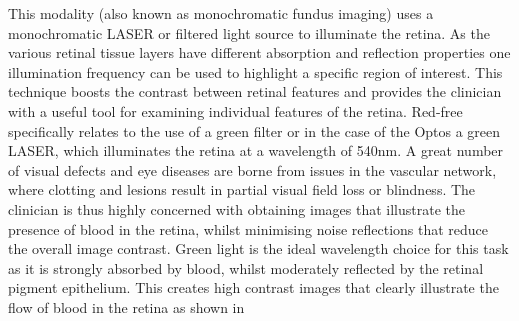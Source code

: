 This modality (also known as monochromatic fundus imaging) uses a monochromatic LASER or filtered light source to illuminate the retina. As the various retinal tissue layers have different absorption and reflection properties one illumination frequency can be used to highlight a specific region of interest. This technique boosts the contrast between retinal features and provides the clinician with a useful tool for examining individual features of the retina. Red-free specifically relates to the use of a green filter or in the case of the Optos a green LASER, which illuminates the retina at a wavelength of 540nm. A great number of visual defects and eye diseases are borne from issues in the vascular network, where clotting and lesions result in partial visual field loss or blindness. The clinician is thus highly concerned with obtaining images that illustrate the presence of blood in the retina, whilst minimising noise reflections that reduce the overall image contrast. Green light is the ideal wavelength choice for this task as it is strongly absorbed by blood, whilst moderately reflected by the retinal pigment epithelium. This creates high contrast images that clearly illustrate the flow of blood in the retina as shown in 
